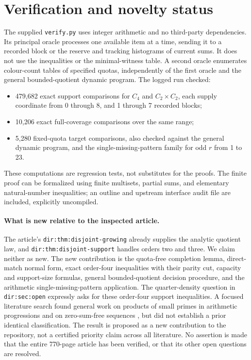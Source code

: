 \documentclass[11pt]{article}
\theoremstyle{remark}\newtheorem{remark}[theorem]{Remark}
\begin{document}
\section{Verification and novelty status}
The supplied \texttt{verify.py} uses integer arithmetic and no third-party dependencies. Its principal oracle processes one available item at a time, sending it to a recorded block or the reserve and tracking histograms of current sums. It does not use the inequalities or the minimal-witness table. A second oracle enumerates colour-count tables of specified quotas, independently of the first oracle and the general bounded-quotient dynamic program. The logged run checked:
\begin{itemize}
\item 479,682 exact support comparisons for $C_4$ and $C_2\times C_2$, each supply coordinate from 0 through 8, and 1 through 7 recorded blocks;
\item 10,206 exact full-coverage comparisons over the same range;
\item 5,280 fixed-quota target comparisons, also checked against the general dynamic program, and the single-missing-pattern family for odd $r$ from 1 to 23.
\end{itemize}
These computations are regression tests, not substitutes for the proofs. The finite proof can be formalized using finite multisets, partial sums, and elementary natural-number inequalities; an outline and upstream interface audit file are included, explicitly uncompiled.

\paragraph{What is new relative to the inspected article.}
The article's \texttt{dir:thm:disjoint-growing} already supplies the analytic quotient law, and \texttt{dir:thm:disjoint-support} handles orders two and three. We claim neither as new. The new contribution is the quota-free completion lemma, direct-match normal form, exact order-four inequalities with their parity cut, capacity and support-size formulas, general bounded-quotient decision procedure, and the arithmetic single-missing-pattern application. The quarter-density question in \texttt{dir:sec:open} expressly asks for these order-four support inequalities. A focused literature search found general work on products of small primes in arithmetic progressions \cite{products} and on zero-sum-free sequences \cite{zerosum}, but did not establish a prior identical classification. The result is proposed as a new contribution to the repository, not a certified priority claim across all literature. No assertion is made that the entire 770-page article has been verified, or that its other open questions are resolved.
\end{document}
